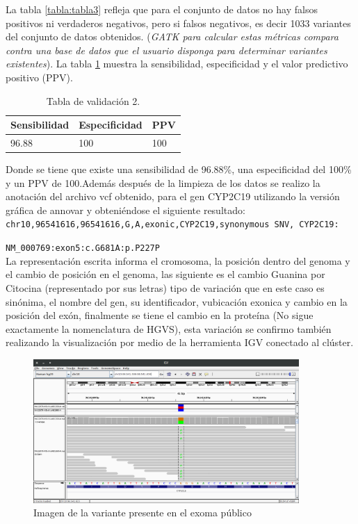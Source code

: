 La tabla \ref{tabla:tabla3} refleja que para el conjunto de datos no hay falsos positivos ni verdaderos negativos, pero si falsos negativos, es decir 1033 variantes del conjunto de datos obtenidos. (\textit{GATK para calcular estas métricas compara contra una base de datos que el usuario disponga para determinar variantes existentes}).  La tabla \ref{tabla:tabla4} muestra la sensibilidad, especificidad y el valor predictivo positivo (PPV).

\begin{table}[H]
	\begin{center}
		\begin{tabular}{|l|l|l|}
			\hline 
			\textbf{Sensibilidad} & \textbf{Especificidad} & \textbf{PPV} \\
			\hline 
			96.88 & 100 & 100 \\ \hline
		\end{tabular}
		\caption{Tabla de validación 2.}
		\label{tabla:tabla4}
	\end{center}
\end{table}

Donde se tiene que existe una sensibilidad de 96.88\%, una especificidad del 100\% y un PPV de 100.Además después de la limpieza de los datos se realizo la anotación del archivo vcf obtenido, para el gen CYP2C19 utilizando la versión gráfica de annovar \cite{Yang2015} y obteniéndose el siguiente resultado: \\

\texttt{chr10,96541616,96541616,G,A,exonic,CYP2C19,synonymous SNV, CYP2C19:}

\texttt{NM\_000769:exon5:c.G681A:p.P227P} \\

La representación escrita informa el cromosoma, la posición dentro del genoma y el cambio de posición en el genoma, las siguiente es el cambio Guanina por Citocina (representado por sus letras) tipo de variación que en este caso es sinónima, el nombre del gen, su identificador, vubicación exonica y cambio en la posición del exón, finalmente se tiene el cambio en la proteína (No sigue exactamente la nomenclatura de HGVS), esta variación se confirmo también realizando la visualización por medio de la herramienta IGV conectado al clúster.

\begin{figure}[H]
	\centering
	\includegraphics[width=0.9\textwidth]{Kap2/IGV}
	\caption{Imagen de la variante presente en el exoma público} \label{fig:igv}
\end{figure}

